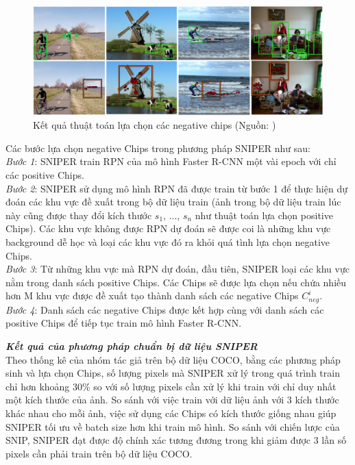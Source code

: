 {    \begin{figure}[H]
        \centering
        \includegraphics[width=13cm] {images/sniper_neg_chip}
        \caption{Kết quả thuật toán lựa chọn các negative chips (Nguồn: \cite{singh2018sniper})}
        \label{fig:sniper_pos_chip}
    \end{figure}

    \noindent
    Các bước lựa chọn negative Chips trong phương pháp SNIPER  như sau: \\
    \textit{Bước 1}: SNIPER  train RPN của mô hình Faster R-CNN một vài epoch với chỉ các positive Chips. \\
    \textit{Bước 2}: SNIPER  sử dụng mô hình RPN đã được train từ bước 1 để thực hiện dự đoán các khu vực đề xuất trong bộ dữ liệu train (ảnh trong bộ dữ liệu train lúc này cũng được thay đổi kích thước {${s}_{1}$, ..., ${s}_{n}$} như thuật toán lựa chọn positive Chips).
    Các khu vực không được RPN dự đoán sẽ được coi là những khu vực background  dễ học và loại các khu vực đó ra khỏi quá tình lựa chọn negative Chips. \\
    \textit{Bước 3}: Từ những khu vực mà RPN dự đoán, đầu tiên, SNIPER  loại các khu vực nằm trong danh sách positive Chips.
    Các Chips sẽ được lựa chọn nếu chứa nhiều hơn M khu vực được đề xuất tạo thành danh sách các negative Chips ${C}_{neg}^{i}$. \\
    \textit{Bước 4}: Danh sách các negative Chips được kết hợp cùng với danh sách các positive Chips để tiếp tục train mô hình Faster R-CNN.

    \noindent
    \textbf{\textit{Kết quả của phương pháp chuẩn bị dữ liệu SNIPER }} \\
    Theo thống kê của nhóm tác giả trên bộ dữ liệu COCO, bằng các phương pháp sinh và lựa chọn Chips, số lượng pixels  mà SNIPER  xử lý trong quá trình train chỉ hơn khoảng 30\% so với số lượng pixels  cần xử lý khi train với chỉ duy nhất một kích thước của ảnh.
    So sánh với việc train với dữ liệu ảnh với 3 kích thước khác nhau cho mỗi ảnh, việc sử dụng các Chips có kích thước giống nhau giúp SNIPER  tối ưu về batch size hơn khi train mô hình.
    So sánh với chiến lược của SNIP, SNIPER  đạt được độ chính xác tương đương trong khi giảm được 3 lần số pixels  cần phải train trên bộ dữ liệu COCO.

}
